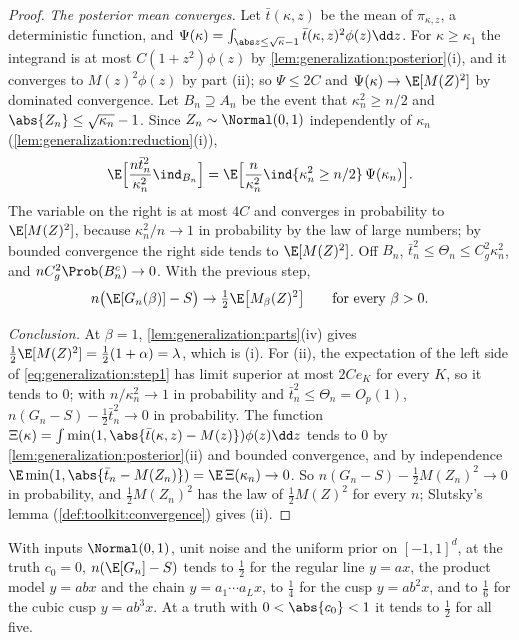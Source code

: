 \begin{refsection}
\begin{proof}
\emph{The posterior mean converges.} Let $\bar t(\kappa,z)$ be the mean of $\pi_{\kappa,z}$, a deterministic function, and $\Psi(\kappa)=\int_{\abs z\le\sqrt\kappa-1}\bar t(\kappa,z)^2\phi(z)\dd z$. For $\kappa\ge\kappa_1$ the integrand is at most $C(1+z^2)\phi(z)$ by \cref{lem:generalization:posterior}(i), and it converges to $M(z)^2\phi(z)$ by part (ii); so $\Psi\le2C$ and $\Psi(\kappa)\to\E[M(Z)^2]$ by dominated convergence. Let $B_n\supseteq A_n$ be the event that $\kappa_n^2\ge n/2$ and $\abs{Z_n}\le\sqrt{\kappa_n}-1$. Since $Z_n\sim\Normal(0,1)$ independently of $\kappa_n$ (\cref{lem:generalization:reduction}(i)),
\[
\E\Bigl[\frac{n\bar t_n^2}{\kappa_n^2}\ind_{B_n}\Bigr]=\E\Bigl[\frac n{\kappa_n^2}\ind\{\kappa_n^2\ge n/2\}\,\Psi(\kappa_n)\Bigr].
\]
The variable on the right is at most $4C$ and converges in probability to $\E[M(Z)^2]$, because $\kappa_n^2/n\to1$ in probability by the law of large numbers; by bounded convergence the right side tends to $\E[M(Z)^2]$. Off $B_n$, $\bar t_n^2\le\Theta_n\le C_g^2\kappa_n^2$, and $nC_g^2\Prob(B_n^c)\to0$. With the previous step,
\begin{equation}\label{eq:generalization:anybeta}
n\bigl(\E[G_n(\beta)]-S\bigr)\to\tfrac12\E\bigl[M_\beta(Z)^2\bigr]\qquad\text{for every }\beta>0.
\end{equation}

\emph{Conclusion.} At $\beta=1$, \cref{lem:generalization:parts}(iv) gives $\frac12\E[M(Z)^2]=\frac12(1+\alpha)=\lambda$, which is (i). For (ii), the expectation of the left side of \eqref{eq:generalization:step1} has limit superior at most $2Ce_K$ for every $K$, so it tends to $0$; with $n/\kappa_n^2\to1$ in probability and $\bar t_n^2\le\Theta_n=O_p(1)$, $n(G_n-S)-\frac12\bar t_n^2\to0$ in probability. The function $\Xi(\kappa)=\int\min(1,\abs{\bar t(\kappa,z)-M(z)})\phi(z)\dd z$ tends to $0$ by \cref{lem:generalization:posterior}(ii) and bounded convergence, and by independence $\E\min(1,\abs{\bar t_n-M(Z_n)})=\E\,\Xi(\kappa_n)\to0$. So $n(G_n-S)-\frac12M(Z_n)^2\to0$ in probability, and $\frac12M(Z_n)^2$ has the law of $\frac12M(Z)^2$ for every $n$; Slutsky's lemma (\cref{def:toolkit:convergence}) gives (ii).
\end{proof}

\begin{corollary}\label{cor:generalization:running}
With inputs $\Normal(0,1)$, unit noise and the uniform prior on $[-1,1]^d$, at the truth $c_0=0$, $n(\E[G_n]-S)$ tends to $\frac12$ for the regular line $y=ax$, the product model $y=abx$ and the chain $y=a_1\cdots a_Lx$, to $\frac14$ for the cusp $y=ab^2x$, and to $\frac16$ for the cubic cusp $y=ab^3x$. At a truth with $0<\abs{c_0}<1$ it tends to $\frac12$ for all five.
\end{corollary}


\end{refsection}
